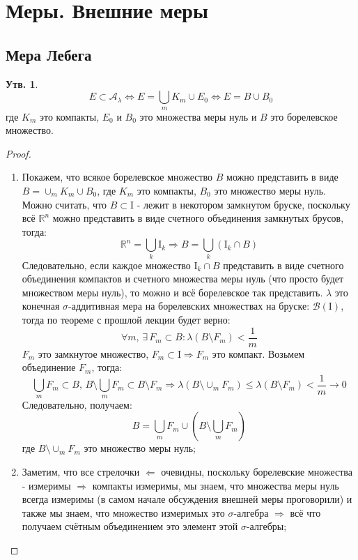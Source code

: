 \documentclass[12pt]{article}
\newcommand{\RN}[1]{%
	\textup{\uppercase\expandafter{\romannumeral#1}}%
}
\newcommand{\MR}{\mathbb{R}}
\newcommand{\MI}{\mathrm{I}}
\newcommand{\MA}{\mathcal{A}}
\newcommand{\MB}{\mathcal{B}}
\theoremstyle{definition}
\newtheorem{prop}{Утв.}
\begin{document}
\lhead{Математический анализ - \RN{4}}
\section*{Меры. Внешние меры}

\subsection*{Мера Лебега}
\begin{prop}
	$$
		E \subset \MA_\lambda \Leftrightarrow E = \bigcup\limits_m K_m \cup E_0 \Leftrightarrow E = B \cup B_0
	$$ 
	где $K_m$ это компакты, $E_0$ и $B_0$ это множества меры нуль и $B$ это борелевское множество.
\end{prop}

\begin{proof}\hfill
	\begin{enumerate}[label=\arabic*)]
		\item Покажем, что всякое борелевское множество $B$ можно представить в виде $B = \cup_m K_m \cup B_0$, где $K_m$ это компакты, $B_0$ это множество меры нуль. Можно считать, что $B \subset \MI$ - лежит в некотором замкнутом бруске, поскольку всё $\MR^n$ можно представить в виде счетного объединения замкнутых брусов, тогда:
		$$
			\MR^n = \bigcup\limits_k \MI_k \Rightarrow B = \bigcup\limits_k (\MI_k \cap B)
		$$
		Следовательно, если каждое множество $\MI_k \cap B$ представить в виде счетного объединения компактов и счетного множества меры нуль (что просто будет множеством меры нуль), то можно и всё борелевское так представить. $\lambda$ это конечная $\sigma$-аддитивная мера на борелевских множествах на бруске: $\MB(\MI)$, тогда по теореме с прошлой лекции будет верно:
		$$
			\forall m, \, \exists \, F_m \subset B \colon \lambda(B \setminus F_m) < \dfrac{1}{m}
		$$
		$F_m$ это замкнутое множество, $F_m \subset \MI \Rightarrow F_m$ это компакт. Возьмем объединение $F_m$, тогда:
		$$
			\bigcup\limits_m F_m \subset B , \, B \setminus \bigcup\limits_m F_m \subset B \setminus F_m \Rightarrow \lambda(B \setminus \cup_m F_m) \leq \lambda(B \setminus F_m) < \dfrac{1}{m} \to 0
		$$
		Следовательно, получаем: 
		$$
			B = \bigcup\limits_m F_m \cup \left(B \setminus \bigcup\limits_m F_m\right)
		$$ 
		где $B \setminus \cup_m F_m$ это множество меры нуль;
		\item Заметим, что все стрелочки $\Leftarrow$ очевидны, поскольку борелевские множества - измеримы $\Rightarrow$ компакты измеримы, мы знаем, что множества меры нуль всегда измеримы (в самом начале обсуждения внешней меры проговорили) и также мы знаем, что множество измеримых это $\sigma$-алгебра $\Rightarrow$ всё что получаем счётным объединением это элемент этой $\sigma$-алгебры;

\end{enumerate}
\end{proof}
\end{document}
